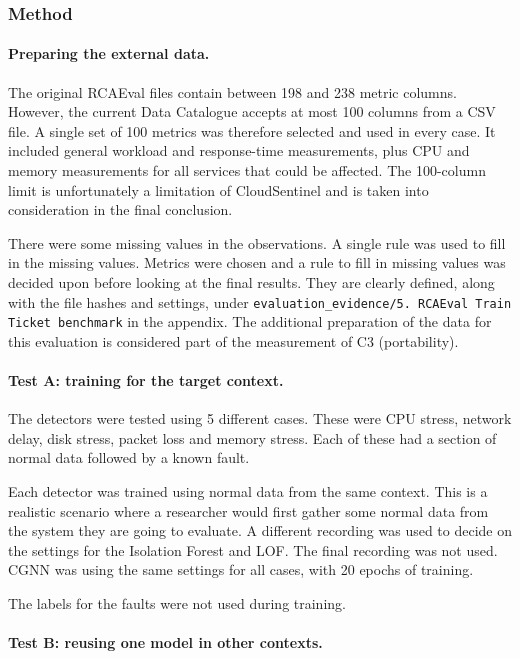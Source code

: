 \subsubsection{Method}

\paragraph{Preparing the external data.}

The original RCAEval files contain between 198 and 238 metric columns. However, the current Data Catalogue accepts at most 100 columns from a CSV file. A single set of 100 metrics was therefore selected and used in every case. It included general workload and response-time measurements, plus CPU and memory measurements for all services that could be affected. The 100-column limit is unfortunately a limitation of CloudSentinel and is taken into consideration in the final conclusion.

There were some missing values in the observations. A single rule was used to fill in the missing values. Metrics were chosen and a rule to fill in missing values was decided upon before looking at the final results. They are clearly defined, along with the file hashes and settings, under \texttt{evaluation\_evidence/5. RCAEval Train Ticket benchmark} in the appendix. The additional preparation of the data for this evaluation is considered part of the measurement of C3 (portability).

\paragraph{Test A: training for the target context.}

The detectors were tested using 5 different cases. These were CPU stress, network delay, disk stress, packet loss and memory stress. Each of these had a section of normal data followed by a known fault.

Each detector was trained using normal data from the same context. This is a realistic scenario where a researcher would first gather some normal data from the system they are going to evaluate. A different recording was used to decide on the settings for the Isolation Forest and LOF. The final recording was not used. CGNN was using the same settings for all cases, with 20 epochs of training.

The labels for the faults were not used during training.

\paragraph{Test B: reusing one model in other contexts.}

